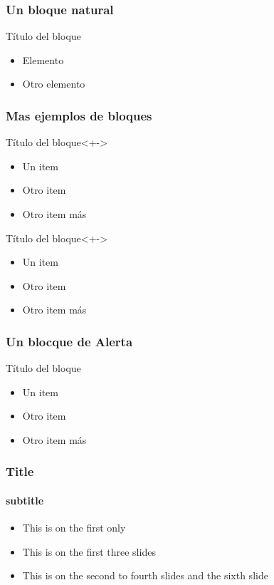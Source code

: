 

  \begin{frame}
    \frametitle{Un bloque natural} 
    \begin{block}{Título del bloque}
    \begin{itemize}
      \item Elemento
      \item Otro elemento
    \end{itemize}
    \end{block}
  \end{frame}


   \begin{frame}
   \frametitle{Mas ejemplos de bloques} 
   \begin{exampleblock}{Título del bloque}<+->
      \begin{itemize}
      \item Un item
      \item Otro item
      \item Otro item más
      \end{itemize}
   \end{exampleblock}

   \begin{exampleblock}{Título del bloque}<+->
      \begin{itemize}
      \item<+-> Un item
      \item<+-> Otro item
      \item<+-> Otro item más
      \end{itemize}
   \end{exampleblock}
   \end{frame}


  \begin{frame}
    \frametitle{Un blocque de Alerta} 
    \begin{alertblock}{Título del bloque}
      \begin{itemize}
        \item Un item
        \item Otro item
        \item Otro item más
      \end{itemize}
    \end{alertblock}
  \end{frame}

   \begin{frame}
   \frametitle{Title}
   \framesubtitle{subtitle}
     \begin{itemize}
       \item<+-> This is on the first only
       \item<+-> This is on the first three slides
       \item<+-> This is on the second to fourth slides and the sixth slide
     \end{itemize}
   \end{frame}


